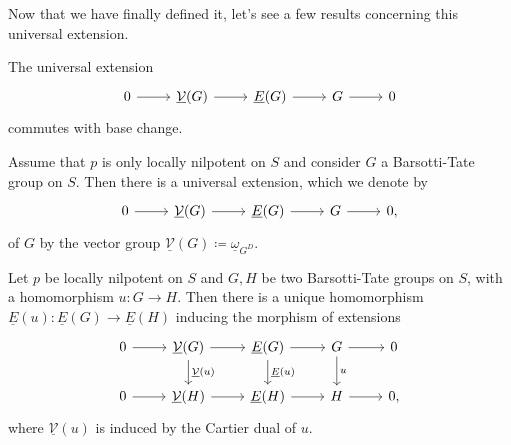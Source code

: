 \noindent
Now that we have finally defined it, let's see
a few results concerning this universal extension.


\begin{lem}
\label{UnivExtensionCommutesWBaseChange}
	The universal extension 
	\begin{equation*}
	\begin{tikzcd}
		0 \arrow[r, "", rightarrow] &
		\underline{\mathcal{V}}(G) \arrow[r, "", rightarrow] &
		\underline{E}(G) \arrow[r, "", rightarrow] &
		G \arrow[r, "", rightarrow] &
		0
	\end{tikzcd}
	\end{equation*}
	commutes with base change.
\end{lem} 


\begin{lem}
	Assume that $p$ is only locally nilpotent on $S$
	and consider $G$ a Barsotti-Tate group on $S$.
	Then there is a universal extension, which we denote by
	\begin{equation*}
	\begin{tikzcd}
		0 \arrow[r, "", rightarrow] &
		\underline{\mathcal{V}}(G) \arrow[r, "", rightarrow] &
		\underline{E}(G) \arrow[r, "", rightarrow] &
		G \arrow[r, "", rightarrow] &
		0
	,\end{tikzcd}
	\end{equation*}
	of $G$ by the vector group
	$\underline{\mathcal{V}}(G) \coloneqq \underline{\omega}_{G^D}$.
\end{lem} 


\begin{prop}\label{prop:MorUnivExts}
	Let $p$ be locally nilpotent on $S$ and $G,H$ be two
	Barsotti-Tate groups on $S$, with a homomorphism $u\colon G \to H$.
	Then there is a unique homomorphism
	$\underline{E}(u)\colon \underline{E}(G) \to \underline{E}(H)$ inducing the morphism of extensions
	\begin{equation*}
	\begin{tikzcd}
		0 \arrow[r, "", rightarrow] &
		\underline{\mathcal{V}}(G) \arrow[r, "", rightarrow] 
		\arrow[d, "\underline{\mathcal{V}}(u)", rightarrow] &
		\underline{E}(G) \arrow[r, "", rightarrow] 
		\arrow[d, "\underline{E}(u)", rightarrow] &
		G \arrow[r, "", rightarrow] 
		\arrow[d, "u", rightarrow] &
		0\\
		0 \arrow[r, "", rightarrow] &
		\underline{\mathcal{V}}(H) \arrow[r, "", rightarrow] &
		\underline{E}(H) \arrow[r, "", rightarrow] &
		H \arrow[r, "", rightarrow] &
		0
	,\end{tikzcd}
	\end{equation*}
	where $\underline{\mathcal{V}}(u)$ is induced by the Cartier dual of $u$.
\end{prop} 


